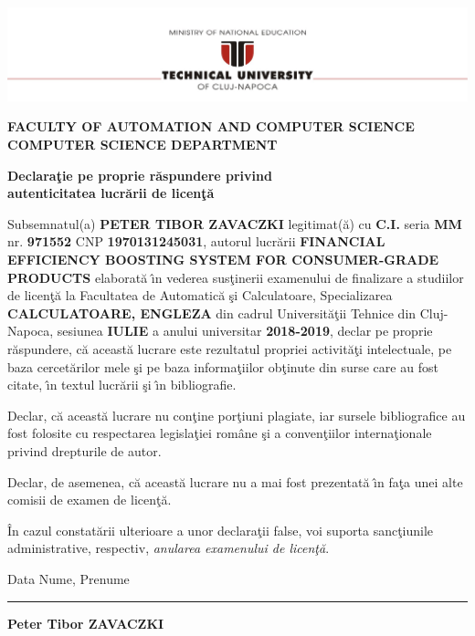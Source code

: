 \documentclass[12pt,a4paper,twoside]{report}
\renewcommand{\thesisauthor}{Peter Tibor ZAVACZKI}    %
\renewcommand{\thesistitle}{FINANCIAL EFFICIENCY BOOSTING SYSTEM FOR CONSUMER-GRADE PRODUCTS}
\newcommand{\department}{\bf FACULTY OF AUTOMATION AND COMPUTER SCIENCE\\
COMPUTER SCIENCE DEPARTMENT}
\newcommand{\utcnlogo}{\includegraphics[width=15cm]{img/tucn.jpg}}
\newcommand{\uline}[1]{\rule[0pt]{#1}{0.4pt}}
\begin{document}
\thispagestyle{empty}
\newpage

\begin{center}
  \utcnlogo

  \department
\end{center}

\vspace{0.5cm}

\begin{center}
  {\bf
    Declara\c{t}ie pe proprie r\u{a}spundere privind\\
    autenticitatea lucr\u{a}rii de licen\c{t}\u{a}}
\end{center}
\vspace{1cm}



Subsemnatul(a) \textbf{PETER TIBOR ZAVACZKI} legitimat(\u{a}) cu \textbf{C.I.} seria \textbf{MM} nr. \textbf{971552} CNP \textbf{1970131245031}, autorul lucr\u{a}rii \textbf{\thesistitle}
elaborat\u{a} \^{\i}n vederea sus\c{t}inerii examenului de finalizare a studiilor de licen\c{t}\u{a} la Facultatea de Automatic\u{a} \c{s}i Calculatoare, Specializarea \textbf{CALCULATOARE, ENGLEZA} din cadrul Universit\u{a}\c{t}ii Tehnice din Cluj-Napoca, sesiunea \textbf{IULIE} a anului universitar \textbf{2018-2019}, declar pe proprie r\u{a}spundere, c\u{a} aceast\u{a} lucrare este rezultatul propriei activit\u{a}\c{t}i intelectuale, pe baza cercet\u{a}rilor mele \c{s}i pe baza informa\c{t}iilor ob\c{t}inute din surse care au fost citate, \^{\i}n textul lucr\u{a}rii \c{s}i \^{\i}n bibliografie.

Declar, c\u{a} aceast\u{a} lucrare nu con\c{t}ine por\c{t}iuni plagiate, iar sursele bibliografice au fost folosite cu
respectarea legisla\c{t}iei rom\^{a}ne \c{s}i a conven\c{t}iilor interna\c{t}ionale privind drepturile de autor.

Declar, de asemenea, c\u{a} aceast\u{a} lucrare nu a mai fost prezentat\u{a} \^{\i}n fa\c{t}a unei alte comisii de examen de licen\c{t}\u{a}.

\^{I}n cazul constat\u{a}rii ulterioare a unor declara\c{t}ii false, voi suporta sanc\c{t}iunile administrative, respectiv, \emph{anularea examenului de licen\c{t}\u{a}}.

\vspace{1.5cm}

Data \hspace{8cm} Nume, Prenume

\vspace{0.5cm}

\uline{3cm} \hspace{5cm} \textbf{\thesisauthor}
\end{document}
